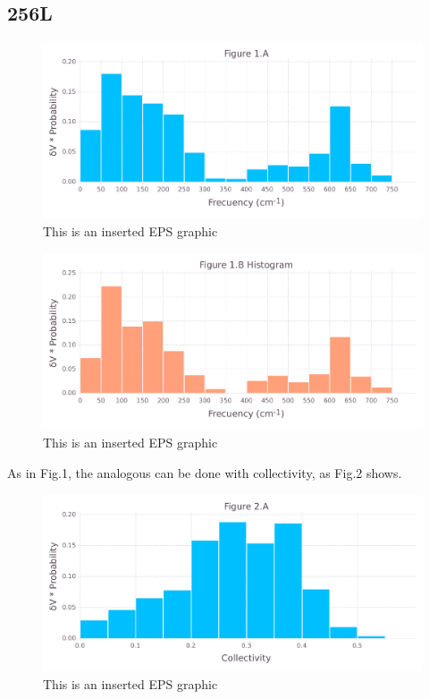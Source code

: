 \documentclass[10pt,letterpaper]{article}
\begin{document}
\FloatBarrier
\newpage

\subsection{256L}

\begin{figure}[ht]
\begin{center}
\includegraphics[scale=0.5]{256l/1afigure_hi-precision.pdf}
\caption{This is an inserted EPS graphic}
\label{fig1}
\end{center}
\end{figure}

\begin{figure}[ht]
\begin{center}
\includegraphics[scale=0.5]{256l/1bfigure_hi-precision.pdf}
\caption{This is an inserted EPS graphic}
\label{fig2}
\end{center}
\end{figure}

\clearpage
As in Fig.1, the analogous can be done with collectivity, as Fig.2 shows.

\begin{figure}[ht]
\begin{center}
\includegraphics[scale=0.5]{256l/2afigure_hi-precision.pdf}
\caption{This is an inserted EPS graphic}
\label{fig3}
\end{center}
\end{figure}
\end{document}

